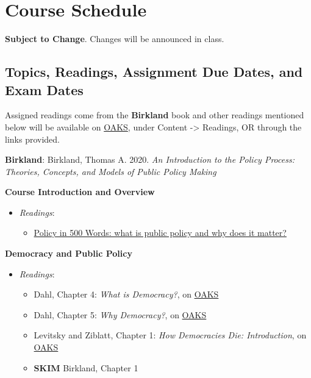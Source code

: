 \hypertarget{course-schedule}{%
\section{Course Schedule}\label{course-schedule}}

\textbf{Subject to Change}. Changes will be announced in class.

\hypertarget{topics-readings-assignment-due-dates-and-exam-dates}{%
\subsection{Topics, Readings, Assignment Due Dates, and Exam
Dates}\label{topics-readings-assignment-due-dates-and-exam-dates}}

Assigned readings come from the \textbf{Birkland} book and other
readings mentioned below will be available on
\href{https://lms.cofc.edu}{OAKS}, under Content -\textgreater{}
Readings, OR through the links provided.

\vspace{0.10in}

\noindent \textbf{Birkland}: Birkland, Thomas A. 2020. \emph{An
Introduction to the Policy Process: Theories, Concepts, and Models of
Public Policy Making}

\SetDate[16/08/2021]

\week \textbf{Course Introduction and Overview}

\begin{itemize}

\item
  \emph{Readings}:

  \begin{itemize}
  
  \item
    \href{https://paulcairney.wordpress.com/2016/04/28/policy-in-500-words-what-is-public-policy-and-why-does-it-matter/}{Policy
    in 500 Words: what is public policy and why does it matter?}
  \end{itemize}
\end{itemize}

\week \textbf{Democracy and Public Policy}

\begin{itemize}

\item
  \emph{Readings}:

  \begin{itemize}
  
  \item
    Dahl, Chapter 4: \emph{What is Democracy?}, on
    \href{https://lms.cofc.edu}{OAKS}
  \item
    Dahl, Chapter 5: \emph{Why Democracy?}, on
    \href{https://lms.cofc.edu}{OAKS}
  \item
    Levitsky and Ziblatt, Chapter 1: \emph{How Democracies Die:
    Introduction}, on \href{https://lms.cofc.edu}{OAKS}
  \item
    \textbf{SKIM} Birkland, Chapter 1
  \end{itemize}
\end{itemize}

